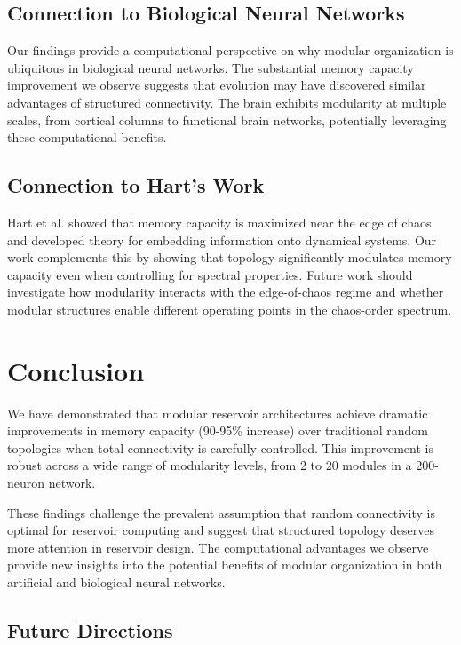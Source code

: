 \documentclass{article}
\begin{document}
\subsection{Connection to Biological Neural Networks}

Our findings provide a computational perspective on why modular organization is ubiquitous in biological neural networks. The substantial memory capacity improvement we observe suggests that evolution may have discovered similar advantages of structured connectivity. The brain exhibits modularity at multiple scales, from cortical columns to functional brain networks, potentially leveraging these computational benefits.

\subsection{Connection to Hart's Work}

Hart et al. \cite{hart2022memory} showed that memory capacity is maximized near the edge of chaos and developed theory for embedding information onto dynamical systems. Our work complements this by showing that topology significantly modulates memory capacity even when controlling for spectral properties. Future work should investigate how modularity interacts with the edge-of-chaos regime and whether modular structures enable different operating points in the chaos-order spectrum.

\section{Conclusion}

We have demonstrated that modular reservoir architectures achieve dramatic improvements in memory capacity (90-95\% increase) over traditional random topologies when total connectivity is carefully controlled. This improvement is robust across a wide range of modularity levels, from 2 to 20 modules in a 200-neuron network.

These findings challenge the prevalent assumption that random connectivity is optimal for reservoir computing and suggest that structured topology deserves more attention in reservoir design. The computational advantages we observe provide new insights into the potential benefits of modular organization in both artificial and biological neural networks.

\subsection{Future Directions}
\end{document}
